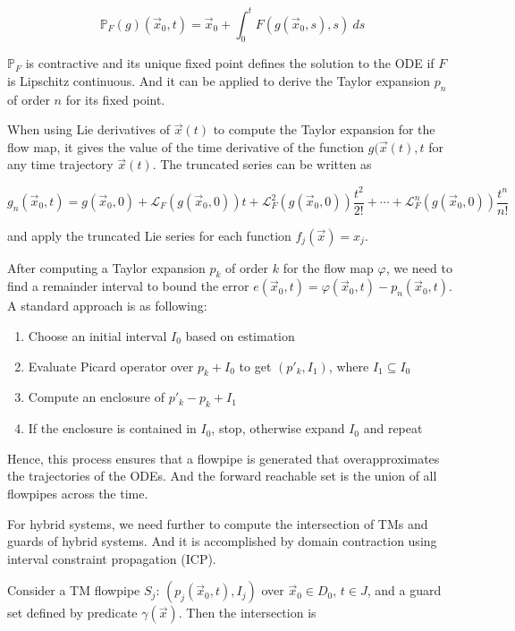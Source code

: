\documentclass[review]{elsarticle}
\theoremstyle{plain}
\theoremstyle{definition}
\theoremstyle{remark}
\numberwithin{equation}{section}
\theoremstyle{remark}
\begin{document}
\begin{equation}
\mathbb{P}_F(g)(\vec{x}_0,t)=\vec{x}_0+\int_0^t F(g(\vec{x}_0,s),s)\ ds 
\end{equation}

\noindent $\mathbb{P}_F$ is contractive and its unique fixed point defines the solution to the ODE if $F$ is Lipschitz continuous. And it can be applied to derive the Taylor expansion $p_n$ of order $n$ for its fixed point.


When using Lie derivatives of $\vec{x}(t)$ to compute the Taylor expansion for the flow map, it gives the value of the time derivative of the function $g(\vec{x}(t),t$ for any time trajectory $\vec{x}(t)$. The truncated series can be written as 

\begin{equation}
g_n(\vec{x}_0,t)=g(\vec{x}_0,0)+\mathcal{L}_F(g(\vec{x}_0,0))t+\mathcal{L}^2_F(g(\vec{x}_0,0))\frac{t^2}{2!}+\cdots+\mathcal{L}^n_F(g(\vec{x}_0,0))\frac{t^n}{n!}
\end{equation}

\noindent and apply the truncated Lie series for each function $f_j(\vec{x})=x_j$.

After computing a Taylor expansion $p_k$ of order $k$ for the flow map $\varphi$, we need to find a remainder interval to bound the error $e(\vec{x}_0,t)=\varphi(\vec{x}_0,t)-p_n(\vec{x}_0,t)$. A standard approach is as following:

\begin{enumerate}
\item Choose an initial interval $I_0$ based on estimation
\item Evaluate Picard operator over $p_k+I_0$ to get $(p'_k,I_1)$, where $I_1 \subseteq I_0$
\item Compute an enclosure of $p'_k-p_k+I_1$
\item If the enclosure is contained in $I_0$, stop, otherwise expand $I_0$ and repeat
\end{enumerate}

Hence, this process ensures that a flowpipe is generated that overapproximates the trajectories of the ODEs. And the forward reachable set is the union of all flowpipes across the time.

For hybrid systems, we need further to compute the intersection of TMs and guards of hybrid systems. And it is accomplished by domain contraction using interval constraint propagation (ICP).

Consider a TM flowpipe $S_j$: $(p_j(\vec{x}_0,t),I_j)$ over $\vec{x}_0\in D_0$, $t\in J$, and a guard set defined by predicate $\gamma (\vec{x})$. Then the intersection is 
\end{document}
